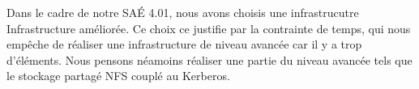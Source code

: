 \documentclass[../Livrable1.tex]{subfiles}
\begin{document}
Dans le cadre de notre SAÉ 4.01, nous avons choisis une infrastrucutre Infrastructure améliorée.
Ce choix ce justifie par la contrainte de temps, qui nous empêche de réaliser une infrastructure de 
niveau avancée car il y a trop d'éléments. Nous pensons néamoins réaliser une partie du niveau avancée
tels que le stockage partagé NFS couplé au Kerberos.
\end{document}
